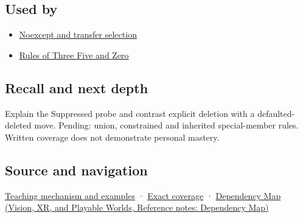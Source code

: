 \subsection{Used by}\label{appendix-42e02a12c694-used-by}

\hypertarget{appendix-42e02a12c694-used-by}{}

\begin{itemize}
\tightlist
\item
  \hyperref[appendix-c746afaa47d1]{Noexcept and transfer selection}
\item
  \hyperref[appendix-7679107d057e]{Rules of Three Five and Zero}
\end{itemize}

\subsection{Recall and next depth}\label{appendix-42e02a12c694-recall-and-next-depth}

\hypertarget{appendix-42e02a12c694-recall-and-next-depth}{}

Explain the Suppressed probe and contrast explicit deletion with a defaulted-deleted move. Pending: union, constrained and inherited special-member rules. Written coverage does not demonstrate personal mastery.

\subsection{Source and navigation}\label{appendix-42e02a12c694-source-and-navigation}

\hypertarget{appendix-42e02a12c694-source-and-navigation}{}

\hyperref[01-foundations-i-ch003-let-the-compiler-compose-the-operations]{Teaching mechanism and examples} · \hyperref[appendix-fd090d982a15-m009---parts-127-147]{Exact coverage} · \href{../07-Vision-XR-and-Playable-Worlds/main.pdf\#nameddest=appendix-4ad47bdd269a}{Dependency Map (Vision, XR, and Playable Worlds, Reference notes: Dependency Map)}

